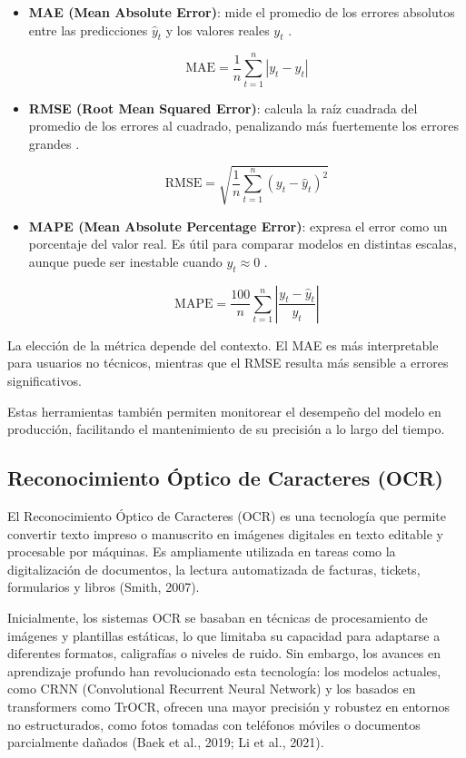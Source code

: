 \begin{itemize}
    \item \textbf{MAE (Mean Absolute Error)}: mide el promedio de los errores absolutos entre las predicciones $\hat{y}_t$ y los valores reales $y_t$ \parencite{willmott2005}.
    
    \[
        \text{MAE} = \frac{1}{n} \sum_{t=1}^{n} \left| y_t - \hat{y}_t \right|
    \]

    \item \textbf{RMSE (Root Mean Squared Error)}: calcula la raíz cuadrada del promedio de los errores al cuadrado, penalizando más fuertemente los errores grandes \parencite{chai2014}.
    
    \[
        \text{RMSE} = \sqrt{ \frac{1}{n} \sum_{t=1}^{n} \left( y_t - \hat{y}_t \right)^2 }
    \]

    \item \textbf{MAPE (Mean Absolute Percentage Error)}: expresa el error como un porcentaje del valor real. Es útil para comparar modelos en distintas escalas, aunque puede ser inestable cuando $y_t \approx 0$ \parencite{myttenaere2016}.
    
    \[
        \text{MAPE} = \frac{100}{n} \sum_{t=1}^{n} \left| \frac{y_t - \hat{y}_t}{y_t} \right|
    \]
\end{itemize}

La elección de la métrica depende del contexto. El MAE es más interpretable para usuarios no técnicos, mientras que el RMSE resulta más sensible a errores significativos. 

Estas herramientas también permiten monitorear el desempeño del modelo en producción, facilitando el mantenimiento de su precisión a lo largo del tiempo.

\subsection{Reconocimiento Óptico de Caracteres (OCR)}

\indent El Reconocimiento Óptico de Caracteres (OCR) es una tecnología que permite convertir texto impreso o manuscrito en imágenes digitales en texto editable y procesable por máquinas. Es ampliamente utilizada en tareas como la digitalización de documentos, la lectura automatizada de facturas, tickets, formularios y libros (Smith, 2007).

\indent Inicialmente, los sistemas OCR se basaban en técnicas de procesamiento de imágenes y plantillas estáticas, lo que limitaba su capacidad para adaptarse a diferentes formatos, caligrafías o niveles de ruido. Sin embargo, los avances en aprendizaje profundo han revolucionado esta tecnología: los modelos actuales, como CRNN (Convolutional Recurrent Neural Network) y los basados en transformers como TrOCR, ofrecen una mayor precisión y robustez en entornos no estructurados, como fotos tomadas con teléfonos móviles o documentos parcialmente dañados (Baek et al., 2019; Li et al., 2021).

